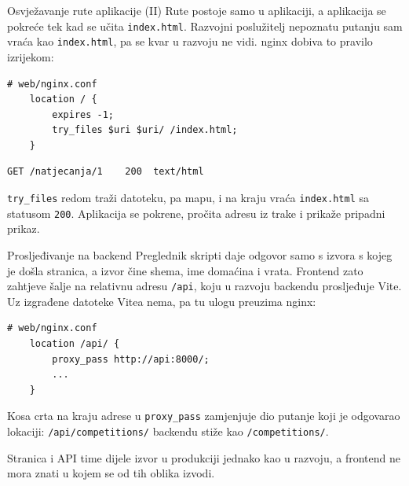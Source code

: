 \begin{frame}[fragile]{Osvježavanje rute aplikacije (II)}
Rute postoje samo u aplikaciji, a aplikacija se pokreće tek kad se učita \texttt{index.html}. Razvojni poslužitelj nepoznatu putanju sam vraća kao \texttt{index.html}, pa se kvar u razvoju ne vidi. nginx dobiva to pravilo izrijekom:

\begin{lstlisting}
# web/nginx.conf
    location / {
        expires -1;
        try_files $uri $uri/ /index.html;
    }
\end{lstlisting}

\begin{lstlisting}
GET /natjecanja/1    200  text/html
\end{lstlisting}

\vspace{0.3em}
\texttt{try\_files} redom traži datoteku, pa mapu, i na kraju vraća \texttt{index.html} sa statusom \texttt{200}. Aplikacija se pokrene, pročita adresu iz trake i prikaže pripadni prikaz.
\end{frame}

\begin{frame}[fragile]{Prosljeđivanje na backend}
Preglednik skripti daje odgovor samo s izvora s kojeg je došla stranica, a izvor čine shema, ime domaćina i vrata. Frontend zato zahtjeve šalje na relativnu adresu \texttt{/api}, koju u razvoju backendu prosljeđuje Vite. Uz izgrađene datoteke Vitea nema, pa tu ulogu preuzima nginx:

\begin{lstlisting}
# web/nginx.conf
    location /api/ {
        proxy_pass http://api:8000/;
        ...
    }
\end{lstlisting}

\vspace{0.3em}
Kosa crta na kraju adrese u \texttt{proxy\_pass} zamjenjuje dio putanje koji je odgovarao lokaciji: \texttt{/api/competitions/} backendu stiže kao \texttt{/competitions/}.

\vspace{0.3em}
Stranica i API time dijele izvor u produkciji jednako kao u razvoju, a frontend ne mora znati u kojem se od tih oblika izvodi.
\end{frame}

